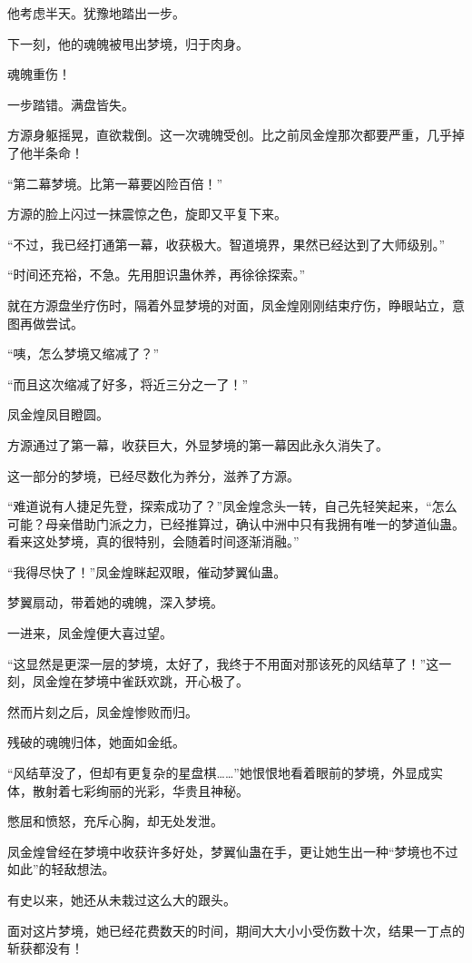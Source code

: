 \begin{this_body}
他考虑半天。犹豫地踏出一步。

下一刻，他的魂魄被甩出梦境，归于肉身。

魂魄重伤！

一步踏错。满盘皆失。

方源身躯摇晃，直欲栽倒。这一次魂魄受创。比之前凤金煌那次都要严重，几乎掉了他半条命！

“第二幕梦境。比第一幕要凶险百倍！”

方源的脸上闪过一抹震惊之色，旋即又平复下来。

“不过，我已经打通第一幕，收获极大。智道境界，果然已经达到了大师级别。”

“时间还充裕，不急。先用胆识蛊休养，再徐徐探索。”

就在方源盘坐疗伤时，隔着外显梦境的对面，凤金煌刚刚结束疗伤，睁眼站立，意图再做尝试。

“咦，怎么梦境又缩减了？”

“而且这次缩减了好多，将近三分之一了！”

凤金煌凤目瞪圆。

方源通过了第一幕，收获巨大，外显梦境的第一幕因此永久消失了。

这一部分的梦境，已经尽数化为养分，滋养了方源。

“难道说有人捷足先登，探索成功了？”凤金煌念头一转，自己先轻笑起来，“怎么可能？母亲借助门派之力，已经推算过，确认中洲中只有我拥有唯一的梦道仙蛊。看来这处梦境，真的很特别，会随着时间逐渐消融。”

“我得尽快了！”凤金煌眯起双眼，催动梦翼仙蛊。

梦翼扇动，带着她的魂魄，深入梦境。

一进来，凤金煌便大喜过望。

“这显然是更深一层的梦境，太好了，我终于不用面对那该死的风结草了！”这一刻，凤金煌在梦境中雀跃欢跳，开心极了。

然而片刻之后，凤金煌惨败而归。

残破的魂魄归体，她面如金纸。

“风结草没了，但却有更复杂的星盘棋……”她恨恨地看着眼前的梦境，外显成实体，散射着七彩绚丽的光彩，华贵且神秘。

憋屈和愤怒，充斥心胸，却无处发泄。

凤金煌曾经在梦境中收获许多好处，梦翼仙蛊在手，更让她生出一种“梦境也不过如此”的轻敌想法。

有史以来，她还从未栽过这么大的跟头。

面对这片梦境，她已经花费数天的时间，期间大大小小受伤数十次，结果一丁点的斩获都没有！


\end{this_body}
